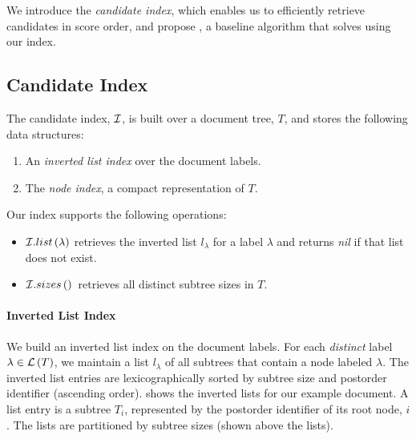 
We introduce the \emph{candidate index}, which enables us to efficiently retrieve candidates in score order, and propose \lowerboundmerge{}, a baseline algorithm that solves \tssqs{} using our index.

\subsection{Candidate Index}
\label{subsec:baseline-index-structure}

The candidate  index, $\mathcal{I}{}$, is built over a document tree, $T$, and stores the following data structures:
\begin{enumerate}
  \item An \emph{inverted list index} over the document labels.
  \item The \emph{node index}, a compact representation of $T$.
\end{enumerate}

\noindent Our index supports the following operations:
\parskip0pt\begin{itemize}
  \item $\mathcal{I}{}.list \left( \lambda \right)$ retrieves the inverted list $l_\lambda$ for a label $\lambda$ and returns \emph{nil} if that list does not exist.
  \item $\mathcal{I}{}.sizes \left(  \right){}$ retrieves all distinct subtree sizes in $T$.
\end{itemize}

\paragraph{Inverted List Index}

We build an inverted list index on the document labels. For each \emph{distinct} label $\lambda \in \mathcal{L} \left( T \right)$, we maintain a list $l_\lambda$ of all subtrees that contain a node labeled $\lambda$. The inverted list entries are lexicographically sorted by subtree size and postorder identifier (ascending order).  shows the inverted lists for our example document. A list entry is a subtree $T_i$, represented by the postorder identifier of its root node, $i$. The lists are partitioned by subtree sizes (shown above the lists).

